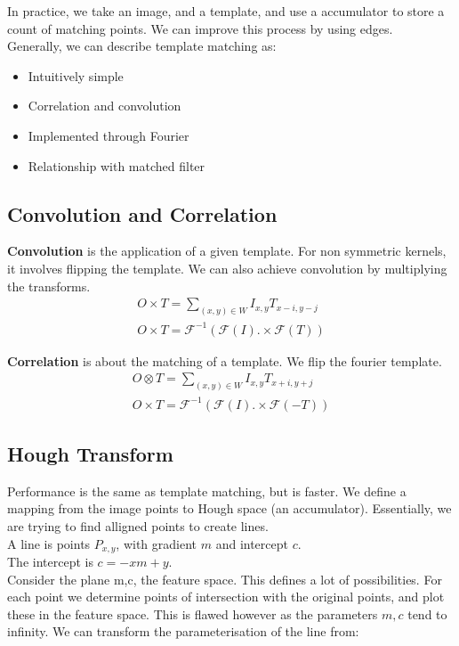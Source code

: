 In practice, we take an image, and a template, and use a accumulator to store a count of matching points. We can improve this process by using edges. \\

Generally, we can describe template matching as:
\begin{itemize}
    \item Intuitively simple
    \item Correlation and convolution
    \item Implemented through Fourier
    \item Relationship with matched filter
\end{itemize}

\subsection{Convolution and Correlation}
\textbf{Convolution} is the application of a given template. For non symmetric kernels, it involves flipping the template. We can also achieve convolution by multiplying the transforms.
\begin{align}
    O \times T = \sum_{(x,y)\in W} I_{x,y} T_{x-i,y-j}\\
    O \times T = \mathcal{F}^{-1}(\mathcal{F}(I).\times\mathcal{F}(T))
\end{align}

\textbf{Correlation} is about the matching of a template. We flip the fourier template.
\begin{align}
    O \otimes T = \sum_{(x,y)\in W} I_{x,y} T_{x+i,y+j}\\
    O \times T = \mathcal{F}^{-1}(\mathcal{F}(I).\times\mathcal{F}(-T))
\end{align}

\subsection{Hough Transform}
Performance is the same as template matching, but is faster. We define a mapping from the image points to Hough space (an accumulator). Essentially, we are trying to find alligned points to create lines.\\ 

\noindent A line is points $P_{x,y}$, with gradient $m$ and intercept $c$. \\
\noindent The intercept is $c=-xm + y$. \\

\noindent Consider the plane m,c, the feature space. This defines a lot of possibilities. For each point we determine points of intersection with the original points, and plot these in the feature space. This is flawed however as the parameters $m,c$ tend to infinity. We can transform the parameterisation of the line from:

